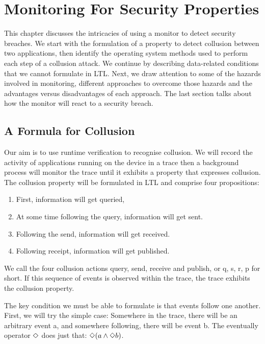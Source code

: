 \chapter{Monitoring For Security Properties}
\label{chap:Monitoring For Security Properties}

This chapter discusses the intricacies of using a monitor to detect security breaches.  We start with the formulation of a property to detect collusion between two applications, then identify the operating system methods used to perform each step of a collusion attack.  We continue by describing data-related conditions that we cannot formulate in LTL.  Next, we draw attention to some of the hazards involved in monitoring, different approaches to overcome those hazards and the advantages versus disadvantages of each approach.  The last section talks about how the monitor will react to a security breach.

\section{A Formula for Collusion}

Our aim is to use runtime verification to recognise collusion.  We will record the activity of applications running on the device in a trace then a background process will monitor the trace until it exhibits a property that expresses collusion.  The collusion property will be formulated in LTL and comprise four propositions: 

\begin{enumerate}
\item First, information will get queried,
\item At some time following the query, information will get sent.
\item Following the send, information will get received.
\item Following receipt, information will get published.
\end{enumerate}

\noindent We call the four collusion actions query, send, receive and publish, or q, s, r, p for short.  If this sequence of events is observed within the trace, the trace exhibits the collusion property.

The key condition we must be able to formulate is that events follow one another.  First, we will try the simple case:  Somewhere in the trace, there will be an arbitrary event a, and somewhere following, there will be event b.  The eventually operator $\Diamond$ does just that: $\Diamond(a \land \Diamond b)$.\\

